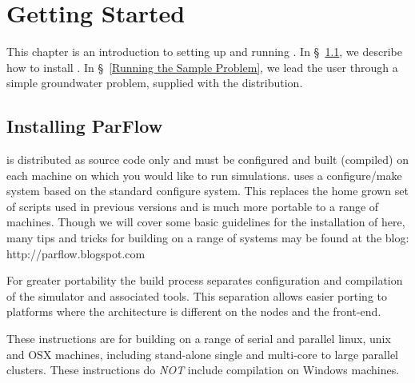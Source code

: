 
\chapter{Getting Started}
\label{Getting Started}

This chapter is an introduction to setting up and running \parflow{}.
In \S~\ref{Installing ParFlow}, we describe how to install \parflow{}.
In \S~\ref{Running the Sample Problem}, we lead the user through a
simple groundwater problem, supplied with the \parflow{} distribution.


\section{Installing ParFlow}
\label{Installing ParFlow}

\parflow{} is distributed as source code only and must be configured and built
(compiled) on each machine on which you would like to run simulations. 
\parflow{} uses a configure/make system based on the standard
 configure system.  This replaces the home grown
set of scripts used in previous versions and is much more portable to
a range of machines.  Though we will cover some basic guidelines for the installation
of \parflow{} here, many tips and tricks for building \parflow{} on a 
range of systems may be found at the \parflow{} blog: http://parflow.blogspot.com

For greater portability the \parflow{} build process separates
configuration and compilation of the simulator and associated tools.
This separation allows easier porting to platforms where the
architecture is different on the nodes and the front-end.

These instructions are for building \parflow{} on a range of serial
and parallel linux, unix and OSX machines, including stand-alone
single and multi-core to large parallel clusters.  These instructions
do \emph{NOT} include compilation on Windows machines.

